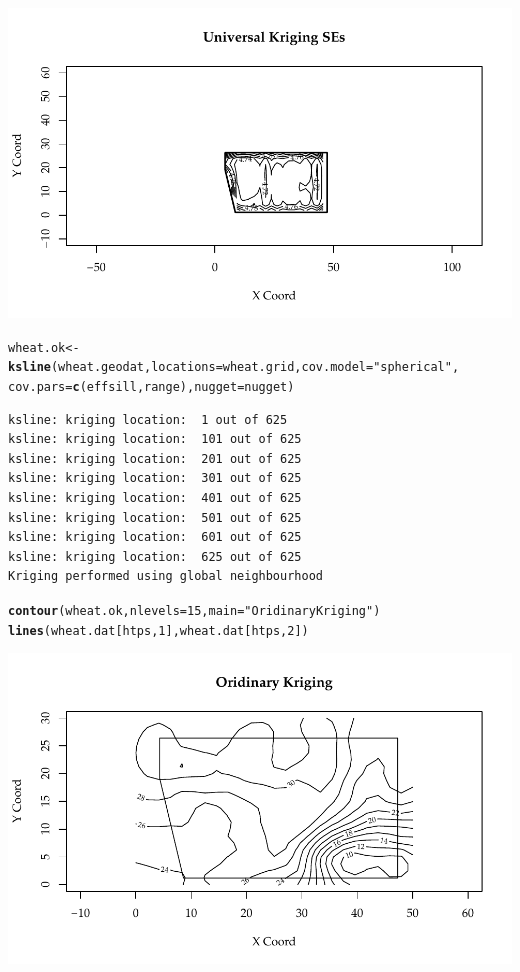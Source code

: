 \documentclass{article}\usepackage[]{graphicx}\usepackage[]{color}
\makeatletter
\def\maxwidth{ %
  \ifdim\Gin@nat@width>\linewidth
    \linewidth
  \else
    \Gin@nat@width
  \fi
}
\newcommand{\hlnum}[1]{\textcolor[rgb]{0.686,0.059,0.569}{#1}}%
\newcommand{\hlstr}[1]{\textcolor[rgb]{0.192,0.494,0.8}{#1}}%
\newcommand{\hlstd}[1]{\textcolor[rgb]{0.345,0.345,0.345}{#1}}%
\newcommand{\hlkwb}[1]{\textcolor[rgb]{0.69,0.353,0.396}{#1}}%
\newcommand{\hlkwc}[1]{\textcolor[rgb]{0.333,0.667,0.333}{#1}}%
\newcommand{\hlkwd}[1]{\textcolor[rgb]{0.737,0.353,0.396}{\textbf{#1}}}%
\newenvironment{kframe}{%
 \def\at@end@of@kframe{}%
 \ifinner\ifhmode%
  \def\at@end@of@kframe{\end{minipage}}%
  \begin{minipage}{\columnwidth}%
 \fi\fi%
 \def\FrameCommand##1{\hskip\@totalleftmargin \hskip-\fboxsep
 \colorbox{shadecolor}{##1}\hskip-\fboxsep
     \hskip-\linewidth \hskip-\@totalleftmargin \hskip\columnwidth}%
 \MakeFramed {\advance\hsize-\width
   \@totalleftmargin\z@ \linewidth\hsize
   \@setminipage}}%
 {\par\unskip\endMakeFramed%
 \at@end@of@kframe}
\newenvironment{knitrout}{}{} %
\makeatother
\begin{document}
\begin{enumerate}
\begin{enumerate}
\begin{knitrout}
{\centering \includegraphics[width=\maxwidth]{figure/prob1d-2} 

}


\begin{kframe}\begin{alltt}
\hlstd{wheat.ok}\hlkwb{<-}\hlkwd{ksline}\hlstd{(wheat.geodat,}\hlkwc{locations}\hlstd{=wheat.grid,}\hlkwc{cov.model}\hlstd{=}\hlstr{"spherical"}\hlstd{,}
\hlkwc{cov.pars}\hlstd{=}\hlkwd{c}\hlstd{(effsill,range),}\hlkwc{nugget}\hlstd{=nugget)}
\end{alltt}
\begin{verbatim}
ksline: kriging location:  1 out of 625 
ksline: kriging location:  101 out of 625 
ksline: kriging location:  201 out of 625 
ksline: kriging location:  301 out of 625 
ksline: kriging location:  401 out of 625 
ksline: kriging location:  501 out of 625 
ksline: kriging location:  601 out of 625 
ksline: kriging location:  625 out of 625 
Kriging performed using global neighbourhood 
\end{verbatim}
\begin{alltt}
\hlkwd{contour}\hlstd{(wheat.ok,}\hlkwc{nlevels}\hlstd{=}\hlnum{15}\hlstd{,} \hlkwc{main} \hlstd{=}\hlstr{"Oridinary Kriging"}\hlstd{)}
\hlkwd{lines}\hlstd{(wheat.dat[htps,}\hlnum{1}\hlstd{],wheat.dat[htps,}\hlnum{2}\hlstd{])}
\end{alltt}
\end{kframe}

{\centering \includegraphics[width=\maxwidth]{figure/prob1d-3} 

}
\end{knitrout}
\end{enumerate}
\end{enumerate}
\end{document}
